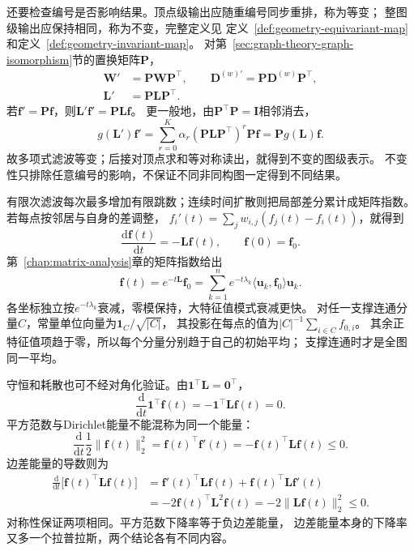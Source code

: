 还要检查编号是否影响结果。顶点级输出应随重编号同步重排，称为等变；
整图级输出应保持相同，称为不变，完整定义见
定义~\ref{def:geometry-equivariant-map}和定义~\ref{def:geometry-invariant-map}。
对第~\ref{sec:graph-theory-graph-isomorphism}节的置换矩阵\(\bm P\)，
\begin{equation}
  \begin{aligned}
    \bm W'&=\bm P\bm W\bm P^\top,\qquad
    \bm D^{(w)\prime}=\bm P\bm D^{(w)}\bm P^\top,\\
    \bm L'&=\bm P\bm L\bm P^\top.
  \end{aligned}
  \label{eq:graph-theory-laplacian-relabel}
\end{equation}
若\(\bm f'=\bm P\bm f\)，则\(\bm L'\bm f'=\bm P\bm L\bm f\)。
更一般地，由\(\bm P^\top\bm P=\bm I\)相邻消去，
\[
  g(\bm L')\bm f'
  =\sum_{r=0}^K\alpha_r(\bm P\bm L\bm P^\top)^r\bm P\bm f
  =\bm P g(\bm L)\bm f.
\]
故多项式滤波等变；后接对顶点求和等对称读出，就得到不变的图级表示。
不变性只排除任意编号的影响，不保证不同非同构图一定得到不同结果。

有限次滤波每次最多增加有限跳数；连续时间扩散则把局部差分累计成矩阵指数。
若每点按邻居与自身的差调整，
\(f_i'(t)=\sum_jw_{i,j}(f_j(t)-f_i(t))\)，就得到
\begin{equation}
  \frac{\mathrm d\bm f(t)}{\mathrm dt}=-\bm L\bm f(t),\qquad
  \bm f(0)=\bm f_0.
  \label{eq:graph-theory-heat-equation}
\end{equation}
第~\ref{chap:matrix-analysis}章的矩阵指数给出
\[
  \bm f(t)=e^{-t\bm L}\bm f_0
  =\sum_{k=1}^ne^{-t\lambda_k}
    \langle\bm u_k,\bm f_0\rangle\bm u_k.
\]
各坐标独立按\(e^{-t\lambda_k}\)衰减，零模保持，大特征值模式衰减更快。
对任一支撑连通分量\(C\)，常量单位向量为\(\bm1_C/\sqrt{|C|}\)，
其投影在每点的值为\(|C|^{-1}\sum_{i\in C}f_{0,i}\)。
其余正特征值项趋于零，所以每个分量分别趋于自己的初始平均；
支撑连通时才是全图同一平均。

守恒和耗散也可不经对角化验证。由\(\bm1^\top\bm L=\bm0^\top\)，
\[
  \frac{\mathrm d}{\mathrm dt}\bm1^\top\bm f(t)
  =-\bm1^\top\bm L\bm f(t)=0.
\]
平方范数与Dirichlet能量不能混称为同一个能量：
\[
  \frac{\mathrm d}{\mathrm dt}\frac12\|\bm f(t)\|_2^2
  =\bm f(t)^\top\bm f'(t)
  =-\bm f(t)^\top\bm L\bm f(t)\leq0.
\]
边差能量的导数则为
\begin{align*}
  \frac{\mathrm d}{\mathrm dt}\bigl[\bm f(t)^\top\bm L\bm f(t)\bigr]
  &=\bm f'(t)^\top\bm L\bm f(t)+\bm f(t)^\top\bm L\bm f'(t)\\
  &=-2\bm f(t)^\top\bm L^2\bm f(t)
   =-2\|\bm L\bm f(t)\|_2^2\leq0.
\end{align*}
对称性保证两项相同。平方范数下降率等于负边差能量，
边差能量本身的下降率又多一个拉普拉斯，两个结论各有不同内容。

